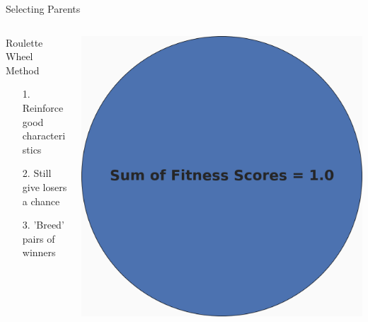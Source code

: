 \documentclass[10pt]{beamer}
\begin{document}
{{%
\begin{frame}{Selecting Parents}
	\begin{columns}[c] %
		\begin{column}{.48\textwidth}
			\begin{block}{Roulette Wheel Method}
    			\begin{itemize}[<+->]
    				\item[1.] {Reinforce good characteristics}
    				\item[2.] {Still give losers a chance}
    				\item[3.] {'Breed' pairs of winners}
    			\end{itemize}
			\end{block}
		\end{column}
		\hfill
		\begin{column}{0.48\textwidth}
		    \begin{overprint}
			    \includegraphics[width=\linewidth]{images/pie0.PNG}

\end{overprint}
\end{column}
\end{columns}
\end{frame}}}
\end{document}
